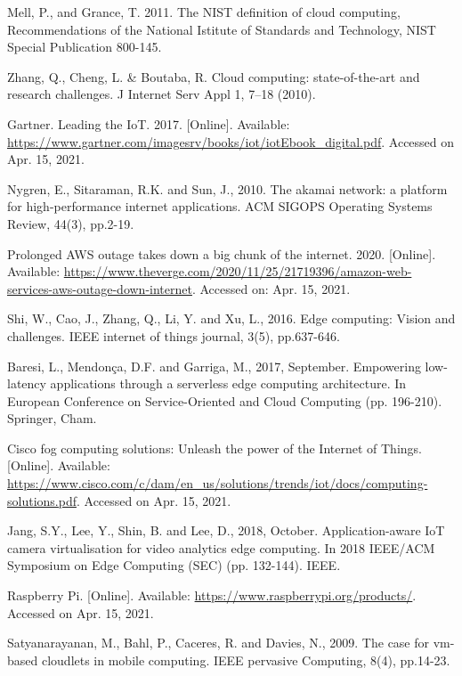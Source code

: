 \begin{thebibliography}{00}
 Mell, P., and Grance, T. 2011. The NIST definition of cloud computing, Recommendations of the National Istitute of Standards and Technology, NIST Special Publication 800-145.

 Zhang, Q., Cheng, L. \& Boutaba, R. Cloud computing: state-of-the-art and research challenges. J Internet Serv Appl 1, 7–18 (2010).

 Gartner. Leading the IoT. 2017. [Online]. Available: \url{https://www.gartner.com/imagesrv/books/iot/iotEbook_digital.pdf}. Accessed on Apr. 15, 2021.

 Nygren, E., Sitaraman, R.K. and Sun, J., 2010. The akamai network: a platform for high-performance internet applications. ACM SIGOPS Operating Systems Review, 44(3), pp.2-19.

 Prolonged AWS outage takes down a big chunk of the internet. 2020. [Online]. Available: \url{https://www.theverge.com/2020/11/25/21719396/amazon-web-services-aws-outage-down-internet}. Accessed on: Apr. 15, 2021.

 Shi, W., Cao, J., Zhang, Q., Li, Y. and Xu, L., 2016. Edge computing: Vision and challenges. IEEE internet of things journal, 3(5), pp.637-646.

 Baresi, L., Mendonça, D.F. and Garriga, M., 2017, September. Empowering low-latency applications through a serverless edge computing architecture. In European Conference on Service-Oriented and Cloud Computing (pp. 196-210). Springer, Cham.

 Cisco fog computing solutions: Unleash the power of the Internet of Things. [Online]. Available: \url{https://www.cisco.com/c/dam/en\_us/solutions/trends/iot/docs/computing-solutions.pdf}. Accessed on Apr. 15, 2021.

 Jang, S.Y., Lee, Y., Shin, B. and Lee, D., 2018, October. Application-aware IoT camera virtualisation for video analytics edge computing. In 2018 IEEE/ACM Symposium on Edge Computing (SEC) (pp. 132-144). IEEE.

 Raspberry Pi. [Online]. Available: \url{https://www.raspberrypi.org/products/}. Accessed on Apr. 15, 2021.

 Satyanarayanan, M., Bahl, P., Caceres, R. and Davies, N., 2009. The case for vm-based cloudlets in mobile computing. IEEE pervasive Computing, 8(4), pp.14-23.


\end{thebibliography}
